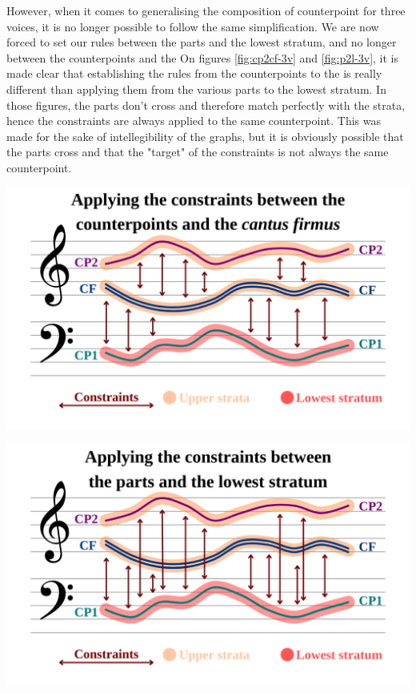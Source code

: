 However, when it comes to generalising the composition of counterpoint for three voices, it is no longer possible to follow the same simplification. We are now forced to set our rules between the parts and the lowest stratum, and no longer between the counterpoints and the \cfdot On figures \ref{fig:cp2cf-3v} and \ref{fig:p2l-3v}, it is made clear that establishing the rules from the counterpoints to the \cf is really different than applying them from the various parts to the lowest stratum. In those figures, the parts don't cross and therefore match perfectly with the strata, hence the constraints are always applied to the same counterpoint. This was made for the sake of intellegibility of the graphs, but it is obviously possible that the parts cross and that the "target" of the constraints is not always the same counterpoint.

\vspace{.5cm}
\begin{minipage}{0.46\textwidth}
    \centering
    \includegraphics[width=\textwidth]{Images/cp2cf-3v.png}
    \label{fig:cp2cf-3v}
    \end{minipage}
    \hfill
    \begin{minipage}{0.46\textwidth}
      \centering
      \includegraphics[width=\textwidth]{Images/p2l-3v.png}
      \label{fig:p2l-3v}
\end{minipage}
\vspace{.5cm}

